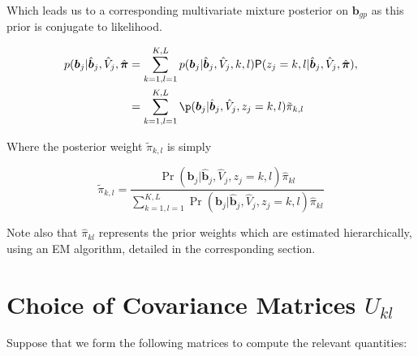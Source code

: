 \documentclass[10pt]{article}
\newcommand{\Prd}{\mathsf{P}} %
\begin{document}
Which leads us to a corresponding multivariate mixture posterior on $\bm{b}_{gp}$ as this prior is conjugate to likelihood.

\begin{equation}
\begin{aligned}
  \label{post_b_j_init}
p(\bm{b}_{j} | \hat{\bm{b}}_{j}, \hat{V}_{j}, \hat{\bm{\pi}} 
&= \sum_{k=1,l=1}^{K,L} p(\bm{b}_{j} | \hat{\bm{b}}_{j}, \hat{V}_{j}, k, l) \Prd(z_{j}=k,l | \hat{\bm{b}}_{j}, \hat{V}_{j}, \hat{\bm{\pi} }),%
 \\
&= \sum_{k=1,l=1}^{K,L} \p(\bm{b}_{j} | \hat{\bm{b}}_{j}, \hat{V}_{j}, z_{j}=k,l)%
\tilde \pi_{k,l}
\end{aligned}
\end{equation}

Where the posterior weight $\tilde \pi_{k,l}$ is simply 

 
 \begin{equation}
 \label{post.pi}
\tilde \pi_{k,l} =\frac{\Pr(\bm{b}_{j} | \hat{\bm{b}}_{j}, \hat{V}_{j}, z_{j}=k,l) \hat \pi_{kl}} {\sum_{k=1,l=1}^{K,L} \Pr(\bm{b}_{j} | \hat{\bm{b}}_{j}, \hat{V}_{j}, z_{j}=k,l) \hat\pi_{kl}}
\end{equation}

Note also that $\hat\pi_{kl}$ represents the prior weights which are estimated hierarchically, using an EM algorithm, detailed in the corresponding section.

\section{Choice of Covariance Matrices $U_{kl}$}

Suppose that we form the following matrices to compute the relevant quantities: 
\end{document}
